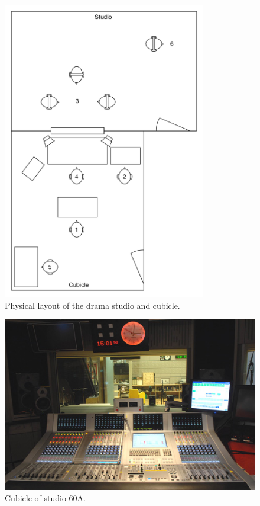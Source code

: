 \begin{figure}[ht]
  \centering
  \includegraphics[width=3.5in]{figs/drama-layout.pdf}
  \caption{Physical layout of the drama studio and cubicle.}
  \label{fig:drama-layout}
\end{figure}

\begin{figure}[ht]
  \centering
  \includegraphics[width=\columnwidth]{figs/60a.jpg}
  \caption{Cubicle of studio 60A.}
  \label{fig:drama-studio}
\end{figure}

